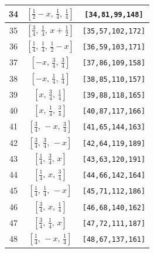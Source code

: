 \documentclass[fleqn,8pt]{jsarticle}
\begin{document}
\begin{longtable}{ccc}
34 & $\left[ \frac{1}{2} - x,\, \frac{1}{4},\, \frac{1}{4} \right]$ & {\tt [34,81,99,148]} \\ \hline
35 & $\left[ \frac{3}{4},\, \frac{1}{4},\, x + \frac{1}{2} \right]$ & {\tt [35,57,102,172]} \\ \hline
36 & $\left[ \frac{1}{4},\, \frac{1}{4},\, \frac{1}{2} - x \right]$ & {\tt [36,59,103,171]} \\ \hline
37 & $\left[ - x,\, \frac{3}{4},\, \frac{3}{4} \right]$ & {\tt [37,86,109,158]} \\ \hline
38 & $\left[ - x,\, \frac{1}{4},\, \frac{1}{4} \right]$ & {\tt [38,85,110,157]} \\ \hline
39 & $\left[ x,\, \frac{3}{4},\, \frac{1}{4} \right]$ & {\tt [39,88,118,165]} \\ \hline
40 & $\left[ x,\, \frac{1}{4},\, \frac{3}{4} \right]$ & {\tt [40,87,117,166]} \\ \hline
41 & $\left[ \frac{3}{4},\, - x,\, \frac{3}{4} \right]$ & {\tt [41,65,144,163]} \\ \hline
42 & $\left[ \frac{3}{4},\, \frac{3}{4},\, - x \right]$ & {\tt [42,64,119,189]} \\ \hline
43 & $\left[ \frac{1}{4},\, \frac{3}{4},\, x \right]$ & {\tt [43,63,120,191]} \\ \hline
44 & $\left[ \frac{1}{4},\, x,\, \frac{3}{4} \right]$ & {\tt [44,66,142,164]} \\ \hline
45 & $\left[ \frac{1}{4},\, \frac{1}{4},\, - x \right]$ & {\tt [45,71,112,186]} \\ \hline
46 & $\left[ \frac{3}{4},\, x,\, \frac{1}{4} \right]$ & {\tt [46,68,140,162]} \\ \hline
47 & $\left[ \frac{3}{4},\, \frac{1}{4},\, x \right]$ & {\tt [47,72,111,187]} \\ \hline
48 & $\left[ \frac{1}{4},\, - x,\, \frac{1}{4} \right]$ & {\tt [48,67,137,161]} \\
\end{longtable}
\renewcommand{\arraystretch}{1.2}
\end{document}
